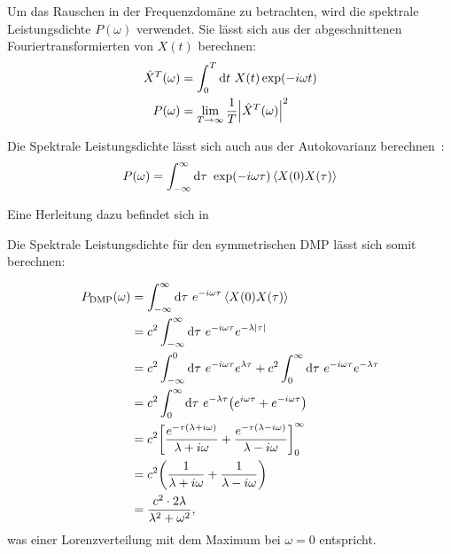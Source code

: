 \documentclass[main.tex]{subfiles}
\begin{document}
Um das Rauschen in der Frequenzdomäne zu betrachten, wird die spektrale
Leistungsdichte \(P(\omega)\) verwendet. Sie lässt sich aus der abgeschnittenen
Fouriertransformierten von \(X(t)\) berechnen:
\begin{align}
	\hat{X}^T(\omega) & = \int_0^T \mathrm{d} t \ X(t) \exp(-i \omega
	t)
	\\
	P(\omega)         & = \lim_{T \to \infty} \frac{1}{T}
	\abs{\hat{X}^T(\omega)}^2
\end{align}

Die Spektrale Leistungsdichte lässt sich auch aus der Autokovarianz berechnen~\cite{Petroni}:
\begin{align}
	P(\omega) = \int_{-\infty}^{\infty} \mathrm{d} \tau \ \exp(-i \omega
	\tau) \expval{X(0) X(\tau)}\label{eq:spd}
\end{align}

Eine Herleitung dazu befindet sich in~\cite{Petroni}

Die Spektrale Leistungsdichte für den symmetrischen DMP lässt sich somit
berechnen:

\begin{align}
	P_\text{DMP}(\omega) & = \int_{-\infty}^{\infty} \dif \tau \ e^{-i
			\omega \tau} \expval{X(0)X(\tau)}\nonumber
	\\
	                     & = c^2 \int_{-\infty}^{\infty} \dif \tau \ e^{-i
			\omega
			\tau}e^{-\lambda \abs{\tau}}\nonumber
	\\
	                     & = c^2 \int_{-\infty}^{0} \dif \tau \ e^{-i
			\omega \tau}e^{\lambda
	\tau} + c^2 \int_{0}^{\infty} \dif \tau \ e^{-i \omega \tau}e^{-\lambda
	\tau}\nonumber
	\\
	                     & = c^2 \int_{0}^{\infty} \dif \tau \ e^{-\lambda
			\tau} \qty(e^{i \omega
		\tau} + e^{-i \omega \tau})\nonumber
	\\
	                     & = c^2 \qty[\frac{e^{-\tau(\lambda +
					i\omega)}}{\lambda + i\omega} +
		\frac{e^{-\tau(\lambda - i\omega)}}{\lambda -
			i\omega}]_{0}^{\infty}\nonumber
	\\
	                     & = c^2\qty(\frac{1}{\lambda + i\omega} +
	\frac{1}{\lambda -
		i\omega})\nonumber
	\\
	                     & = \frac{c^2 \cdot 2\lambda}{\lambda^2 +
		\omega^2},
\end{align}
was einer Lorenzverteilung mit dem Maximum bei \(\omega=0\) entspricht.

\end{document}
